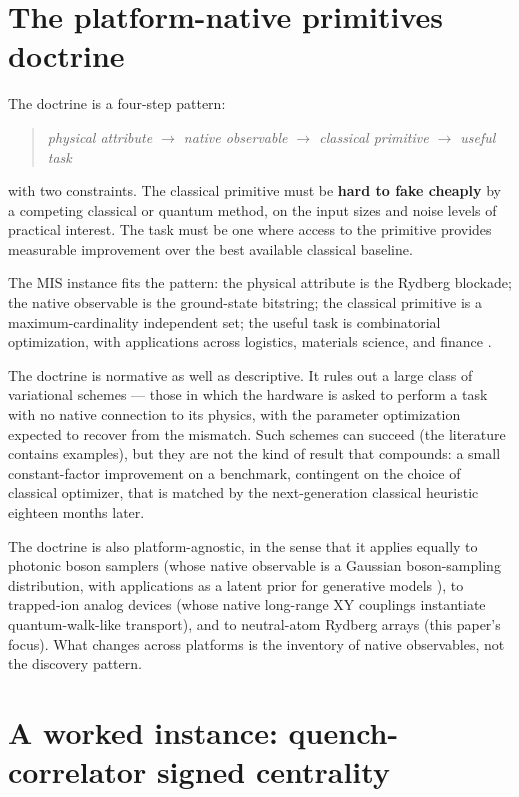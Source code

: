 \documentclass[10pt]{article}
\begin{document}
\section{The platform-native primitives doctrine}\label{sec:doctrine}

The doctrine is a four-step pattern:
\begin{quote}
\itshape physical attribute $\to$ native observable $\to$ classical primitive $\to$ useful task
\end{quote}
with two constraints. The classical primitive must be \textbf{hard to fake cheaply} by a competing classical or quantum method, on the input sizes and noise levels of practical interest. The task must be one where access to the primitive provides measurable improvement over the best available classical baseline.

The MIS instance fits the pattern: the physical attribute is the Rydberg blockade; the native observable is the ground-state bitstring; the classical primitive is a maximum-cardinality independent set; the useful task is combinatorial optimization, with applications across logistics, materials science, and finance \cite{ebadi2022quantum}.

The doctrine is normative as well as descriptive. It rules out a large class of variational schemes --- those in which the hardware is asked to perform a task with no native connection to its physics, with the parameter optimization expected to recover from the mismatch. Such schemes can succeed (the literature contains examples), but they are not the kind of result that compounds: a small constant-factor improvement on a benchmark, contingent on the choice of classical optimizer, that is matched by the next-generation classical heuristic eighteen months later.

The doctrine is also platform-agnostic, in the sense that it applies equally to photonic boson samplers (whose native observable is a Gaussian boson-sampling distribution, with applications as a latent prior for generative models \cite{jurczak2026quantumlatent}), to trapped-ion analog devices (whose native long-range XY couplings instantiate quantum-walk-like transport), and to neutral-atom Rydberg arrays (this paper's focus). What changes across platforms is the inventory of native observables, not the discovery pattern.

\section{A worked instance: quench-correlator signed centrality}\label{sec:instance}
\end{document}
